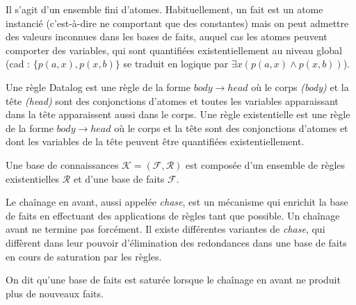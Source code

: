 \begin{definition} Il s'agit d'un ensemble fini d'atomes. Habituellement, un fait est un atome instancié (c'est-à-dire ne comportant que des constantes) mais on peut admettre des valeurs inconnues dans les bases de faits, auquel cas les atomes peuvent comporter des variables, qui sont quantifiées existentiellement au niveau global (cad : $\{p(a,x), p(x,b)\}$ se traduit en logique par $\exists x (p(a,x) \land p(x,b))$).
\end{definition}

Une règle Datalog est une règle de la forme $body \rightarrow head$ où le corps \textit{(body)} et la tête \textit{(head)} sont des conjonctions d'atomes et toutes les variables apparaissant dans la tête apparaissent aussi dans le corps.
Une règle existentielle est une règle de la forme $body \rightarrow head$ où le corps et la tête sont des conjonctions d'atomes et dont les variables de la tête peuvent être quantifiées existentiellement.

\begin{definition}
Une base de connaissances $\mathcal{K} = (\mathcal{F}, \mathcal{R})$ est composée d'un ensemble de règles existentielles $\mathcal{R}$ et d'une base de faits $\mathcal{F}$.
\end{definition}

Le chaînage en avant, aussi appelée \textit{chase}, est un mécanisme qui enrichit la base de faits en effectuant des applications de règles tant que possible. Un chaînage avant ne termine pas forcément.
Il existe différentes variantes de \textit{chase}, qui diffèrent dans leur pouvoir d'élimination des redondances dans une base de faits en cours de saturation par les règles.
\par On dit qu'une base de faits est saturée lorsque le chaînage en avant ne produit plus de nouveaux faits.




